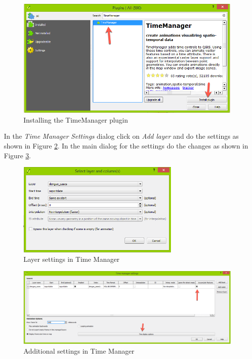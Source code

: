 \documentclass[a4paper,12pt,titlepage]{article}
\begin{document}
\begin{figure}[H]
	\centering
	\includegraphics[width=12cm]{Images/time_manager1.png}
	\caption{Installing the TimeManager plugin}\label{fig:time_manager1}
\end{figure}

In the \textit{Time Manager Settings} dialog click on \textit{Add layer} and do the settings as shown in Figure \ref{fig:time_manager2}. In the main dialog for the settings do the changes as shown in Figure \ref{fig:time_manager3}.

\begin{figure}[H]
	\centering
	\includegraphics[width=8cm]{Images/time_manager2.png}
	\caption{Layer settings in Time Manager}\label{fig:time_manager2}
\end{figure}

\begin{figure}[H]
	\centering
	\includegraphics[width=12cm]{Images/time_manager3.png}
	\caption{Additional settings in Time Manager}\label{fig:time_manager3}
\end{figure}
\end{document}
